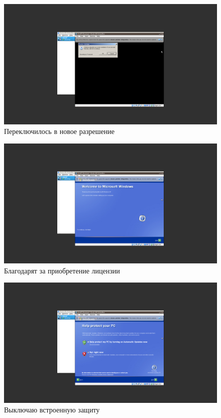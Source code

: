 \documentclass[a4paper]{article}
\begin{document}
\begin{figure}[H]
    \centering
    \includegraphics[width=\linewidth]{21.png}
    \caption{Переключилось в новое разрешение}
\end{figure}

\begin{figure}[H]
    \centering
    \includegraphics[width=\linewidth]{22.png}
    \caption{Благодарят за приобретение лицензии}
\end{figure}


\begin{figure}[H]
    \centering
    \includegraphics[width=\linewidth]{23.png}
    \caption{Выключаю встроенную защиту}
\end{figure}
\end{document}
